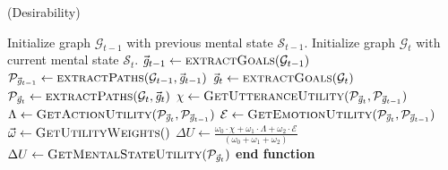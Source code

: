 \documentclass{article}
\begin{document}
\begin{algorithm}
	\caption{(Desirability)}
	\label{array-sum}
	\begin{algorithmic}[1]
			\Statex
			\State Initialize graph $\mathcal{G}_{t-1}$ with previous mental state
			$\mathcal{S}_{t-1}$.
			\State Initialize graph $\mathcal{G}_{t}$ with current mental state
			$\mathcal{S}_{t}$.
			\Statex
			\State $\vec{\mathit{g}}_{t-1} \gets \Call{extractGoals}{\mathcal{G}_{t-1}}$ 
			\State $\mathcal{P}_{\vec{\mathit{g}}_{t-1}} \gets
			\Call{extractPaths}{\mathcal{G}_{t-1}, \vec{\mathit{g}}_{t-1}}$
			\Statex
			\State $\vec{\mathit{g}}_{t} \gets \Call{extractGoals}{\mathcal{G}_{t}}$ 
			\State $\mathcal{P}_{\vec{\mathit{g}}_{t}} \gets \Call{extractPaths}{\mathcal{G}_{t},
			\vec{\mathit{g}}_{t}}$
			\Statex
				\State $\chi \gets
				\Call{GetUtteranceUtility}{\mathcal{P}_{\vec{\mathit{g}}_{t}},
				\mathcal{P}_{\vec{\mathit{g}}_{t-1}}}$ 
				\State $\Lambda \gets
				\Call{GetActionUtility}{\mathcal{P}_{\vec{\mathit{g}}_{t}},
				\mathcal{P}_{\vec{\mathit{g}}_{t-1}}}$ 
				\State $\mathcal{E} \gets
				\Call{GetEmotionUtility}{\mathcal{P}_{\vec{\mathit{g}}_{t}},
				\mathcal{P}_{\vec{\mathit{g}}_{t-1}}}$
				\Statex
				\State $\vec{\omega} \gets \Call{GetUtilityWeights}$
				\Statex
				\State $\Delta U \gets \frac{\omega_{0}\cdot\chi + \omega_{1}\cdot\Lambda +
				\omega_{2}\cdot\mathcal{E}}{(\omega_{0}+\omega_{1}+\omega_{2})}$
				\Statex
				\State $\Delta U \gets
				\Call{GetMentalStateUtility}{\mathcal{P}_{\vec{\mathit{g}}_{t}}}$
			\EndIf
			\Statex
				\State {}
			\Else
				\State {}
			\EndIf
		\EndFunction
		\State \textbf{end function}
	\end{algorithmic}
\end{algorithm}

\pagebreak
\end{document}
